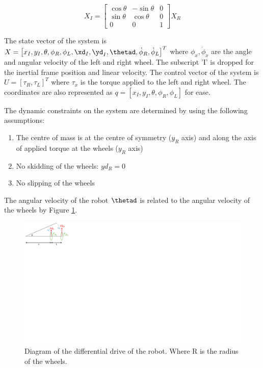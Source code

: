 \documentclass[MTRX3700report.tex]{subfiles}
\begin{document}
\begin{equation}
X_I = 
	\begin{bmatrix}
	\cos\theta & -\sin\theta & 0 \\
	\sin\theta & \cos\theta & 0 \\
	0 & 0 & 1
	\end{bmatrix} X_R \label{rotation}
\end{equation}

The state vector of the system is $X = \left[x_I,y_I,\theta,\phi_R,\phi_L,\xd_I,\yd_I,\thetad,\dot{\phi}_R,\dot{\phi}_L\right]^T$ where $\phi_x,\dot{\phi}_x$ are the angle and angular velocity of the left and right wheel. The subscript 'I' is dropped for the inertial frame position and linear velocity. The control vector of the system is $U = [\tau_R,\tau_L]^T$ where $\tau_x$ is the torque applied to the left and right wheel. The coordinates are also represented as $q = [x_I,y_I,\theta,\phi_R,\phi_L]$ for ease.

The dynamic constraints on the system are determined by using the following assumptions:
\begin{enumerate}
\item The centre of mass is at the centre of symmetry ($y_R$ axis) and along the axis of applied torque at the wheels ($y_R$ axis)
\item No skidding of the wheels: $yd_R = 0 $
\item No slipping of the wheels
\end{enumerate}
The angular velocity of the robot $\thetad$ is related to the angular velocity of the wheels by Figure \ref{fig:robotschematic}.  
\begin{figure}
\centering
\includegraphics[clip,trim=0 15cm 27cm 0, width=0.5\linewidth]{./robotschematic}
\caption{Diagram of the differential drive of the robot. Where R is the radius of the wheels.}
\label{fig:robotschematic}
\end{figure}
\end{document}
